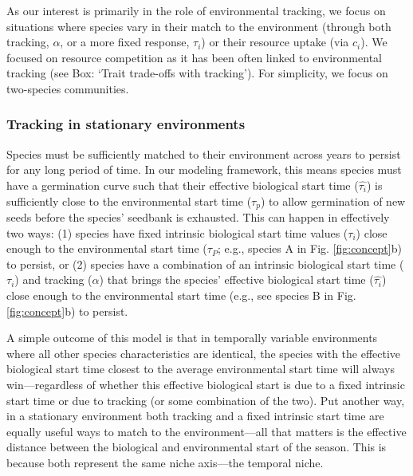 \documentclass[11pt,letterpaper]{article}
\begin{document}
As our interest is primarily in the role of environmental tracking, we focus on situations where species vary in their match to the environment (through both tracking, $\alpha$, or a more fixed response, $\tau_i$) or their resource uptake (via $c_i$). We focused on resource competition as it has been often linked to environmental tracking (see Box: `Trait trade-offs with tracking'). For simplicity, we focus on two-species communities.

\subsubsection{Tracking in stationary environments}
Species must be sufficiently matched to their environment across years to persist for any long period of time. In our modeling framework, this means species must have a germination curve such that their effective biological start time ($\hat{\tau_{i}}$) is sufficiently close to the environmental start time ($\tau_{p}$) to allow germination of new seeds before the species' seedbank is exhausted. This can happen in effectively two ways: (1) species have fixed intrinsic biological start time values ($\tau_i$) close enough to the environmental start time ($\tau_P$; e.g., species A in Fig. \ref{fig:concept}b) to persist, or (2) species have a combination of an intrinsic biological start time ($\tau_i$) and tracking ($\alpha$) that brings the species' effective biological start time ($\hat{\tau_{i}}$) close enough to the environmental start time (e.g., see species B in Fig. \ref{fig:concept}b) to persist.  

A simple outcome of this model is that in temporally variable environments where all other species characteristics are identical, the species with the effective biological start time closest to the average environmental start time will always win---regardless of whether this effective biological start is due to a fixed intrinsic start time or due to tracking (or some combination of the two). Put another way, in a stationary environment both tracking and a fixed intrinsic start time are equally useful ways to match to the environment---all that matters is the effective distance between the biological and environmental start of the season. This is because both represent the same niche axis---the temporal niche. 
\end{document}
